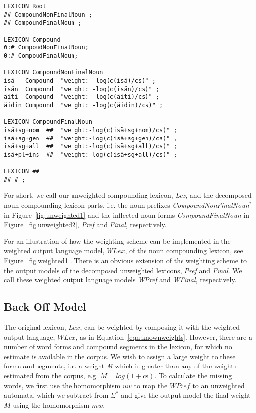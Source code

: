 \documentclass[postprint]{flammie}
\begin{document}
\begin{figure*}[h!]
  \centering
  \begin{scriptsize}
\begin{verbatim}
LEXICON Root
## CompoundNonFinalNoun ;
## CompoundFinalNoun ;

LEXICON Compound
0:# CompoudNonFinalNoun;
0:# CompoudFinalNoun;

LEXICON CompoundNonFinalNoun
isä   Compound  "weight: -log(c(isä)/cs)" ;
isän  Compound  "weight: -log(c(isän)/cs)" ;
äiti  Compound  "weight: -log(c(äiti)/cs)" ;
äidin Compound  "weight: -log(c(äidin)/cs)" ;

LEXICON CompoundFinalNoun
isä+sg+nom  ##  "weight:-log(c(isä+sg+nom)/cs)" ;
isä+sg+gen  ##  "weight:-log(c(isä+sg+gen)/cs)" ;
isä+sg+all  ##  "weight:-log(c(isä+sg+all)/cs)" ;
isä+pl+ins  ##  "weight:-log(c(isä+sg+all)/cs)" ;

LEXICON ##
## # ;
\end{verbatim}
  \end{scriptsize}
  \caption{Structure weighting scheme using token penalties on the
    output language. Note that the functions in the comment field are
    placeholders for the actual weights.}\label{fig:weighted1}
\end{figure*}

For short, we call our unweighted compounding lexicon, \emph{Lex}, and
the decomposed noun compounding lexicon parts, i.e. the noun prefixes
\emph{CompoundNonFinalNoun}$^*$ in Figure~\ref{fig:unweighted1} and
the inflected noun forms \emph{CompoundFinalNoun} in
Figure~\ref{fig:unweighted2}, \emph{Pref} and \emph{Final},
respectively.

For an illustration of how the weighting scheme can be implemented in
the weighted output language model, $WLex$, of the noun compounding
lexicon, see Figure~\ref{fig:weighted1}. There is an obvious extension
of the weighting scheme to the output models of the decomposed
unweighted lexicons, \emph{Pref} and \emph{Final}. We call these
weighted output language models \emph{WPref} and \emph{WFinal},
respectively.

\subsection{Back Off Model}

The original lexicon, $Lex$, can be weighted by composing it with the
weighted output language, $WLex$, as in
Equation~\ref{eqn:knownweights}. However, there are a number of word
forms and compound segments in the lexicon, for which no estimate is
available in the corpus. We wish to assign a large weight to these
forms and segments, i.e. a weight \emph{M} which is greater than any
of the weights estimated from the corpus, e.g. $M =
log(1+\mathrm{cs})$. To calculate the missing words, we first use the
homomorphism $uw$ to map the $WPref$ to an unweighted automata, which we
subtract from $\Sigma^*$ and give the output model the final weight
$M$ using the homomorphism $mw$.
\end{document}
